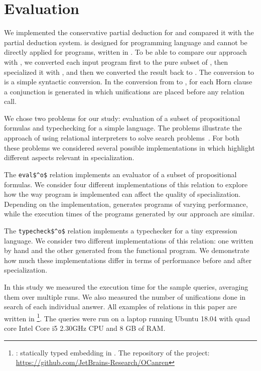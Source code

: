 \section{Evaluation}

We implemented the conservative partial deduction for \mk and compared it with the \ecce partial deduction system.
\ecce is designed for \pro programming language and cannot be directly applied for programs, written in \mk.
To be able to compare our approach with \ecce, we converted each input program first to the pure subset of \pro, then specialized it with \ecce, and then we converted the result back to \mk.
The conversion to \pro is a simple syntactic conversion. In the conversion from \pro to \mk, for each Horn clause a conjunction is generated in which unifications are placed before any relation call.

We chose two problems for our study: evaluation of a subset of propositional formulas and typechecking for a simple language.
The problems illustrate the approach of using relational interpreters to solve search problems~\cite{lozov2019relational}.
For both these problems we considered several possible implementations in \mk which highlight different aspects relevant in specialization.

The \lstinline{eval$^o$} relation implements an evaluator of a subset of propositional formulas.
We consider four different implementations of this relation to explore how the way program is implemented can affect the quality of specialization.
Depending on the implementation, \ecce generates programs of varying performance, while the execution times of the programs generated by our approach are similar.

The \lstinline{typecheck$^o$} relation implements a typechecker for a tiny expression language.
We consider two different implementations of this relation: one written by hand and the other generated from the functional program.
We demonstrate how much these implementations differ in terms of performance before and after specialization.

In this study we measured the execution time for the sample queries, averaging them over multiple runs.
We also measured the number of unifications done in search of each individual answer.
All examples of \mk relations in this paper are written in \oc\footnote{\oc: statically typed \mk embedding in \ocaml. The repository of the project: \url{https://github.com/JetBrains-Research/OCanren}}.
The queries were run on a laptop running Ubuntu 18.04 with quad core Intel Core i5 2.30GHz CPU and 8 GB of RAM.

